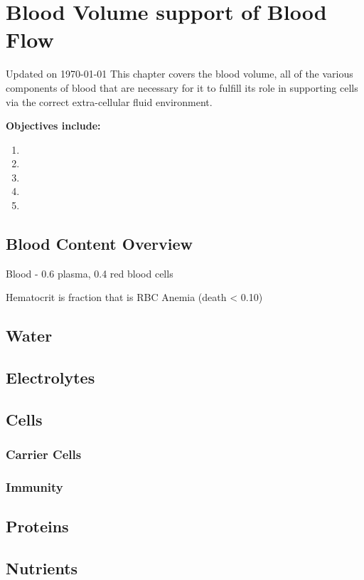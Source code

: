 \chapter{Blood Volume support of Blood Flow}\label{chp:blood_content}
Updated on \today
\minitoc
This chapter covers the blood volume, all of the various components of blood that are necessary for it to fulfill its role in supporting cells via the correct extra-cellular fluid environment.

\vspace{5mm}

\textbf{Objectives include:}
\begin{enumerate}
    \item
    \item
    \item
    \item
    \item
\end{enumerate}

\section{Blood Content Overview}

Blood - 0.6 plasma, 0.4 red blood cells 

Hematocrit is fraction that is RBC
Anemia (death < 0.10)

\section{Water}

\section{Electrolytes}

\section{Cells}
\subsection{Carrier Cells}
\subsection{Immunity}

\section{Proteins}

\section{Nutrients}


\printbibliography[heading=subbibintoc]